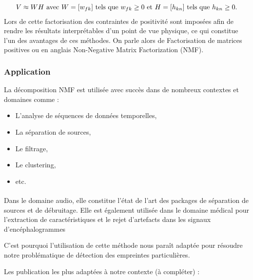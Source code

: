 \begin{equation*}
V \approx WH \\
\text{ avec }
W=[w_{fk}] \text{ tels que } w_{fk} \geq 0 \text{ et } \\
H=[h_{kn}] \text{ tels que } h_{kn} \geq 0.
\end{equation*}
Lors de cette factorisation des contraintes de positivité sont imposées afin de rendre les résultats interprétables d'un point de vue physique, ce qui constitue l'un des avantages de ces méthodes. On parle alors de Factorisation de matrices positives ou en anglais Non-Negative Matrix Factorization (NMF).


\subsubsection{Application}

La décomposition NMF est utilisée avec succès dans de nombreux contextes et domaines comme :

\begin{itemize}
    \item L'analyse de séquences de données temporelles,
    \item La séparation de sources,
    \item Le filtrage,
    \item Le clustering,
    \item etc. 
\end{itemize}

\paragraph{}
Dans le domaine audio, elle constitue l'état de l'art des packages de séparation de sources et de débruitage. Elle est également utilisée dans le domaine médical pour l'extraction de caractéristiques et le rejet d'artefacts dans les signaux d'encéphalogrammes \cite{Nguyen}

C'est pourquoi l'utilisation de cette méthode nous paraît adaptée pour résoudre notre problématique de détection des empreintes particulières.


Les publication les plus adaptées à notre contexte (à compléter) : 
\cite{JialiM}
\cite{Cheung}

